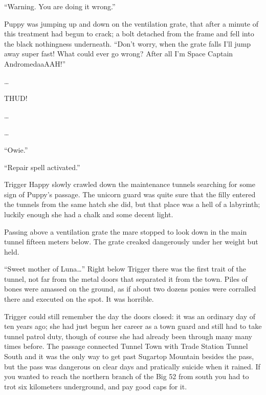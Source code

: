 \horizonline


``{\mt Warning. You are doing it wrong.}''

Puppy was jumping up and down on the ventilation grate, that after a minute of this treatment had begun to crack; a bolt detached from the frame and fell into the black nothingness underneath. ``Don't worry, when the grate falls I'll jump away super fast! What could ever go wrong? After all I'm Space Captain AndromedaaAAH!''

\ldots{}

THUD!

\ldots{}

\ldots{}

``Owie.''

``{\mt Repair spell activated.}''

\horizonline


Trigger Happy slowly crawled down the maintenance tunnels searching for some sign of Puppy's passage. The unicorn guard was quite sure that the filly entered the tunnels from the same hatch she did, but that place was a hell of a labyrinth; luckily enough she had a chalk and some decent light.

Passing above a ventilation grate the mare stopped to look down in the main tunnel fifteen meters below. The grate creaked dangerously under her weight but held.

``Sweet mother of Luna\dots'' Right below Trigger there was the first trait of the tunnel, not far from the metal doors that separated it from the town. Piles of bones were amassed on the ground, as if about two dozens ponies were corralled there and executed on the spot. It was horrible.

Trigger could still remember the day the doors closed: it was an ordinary day of ten years ago; she had just begun her career as a town guard and still had to take tunnel patrol duty, though of course she had already been through many many times before. The passage connected Tunnel Town with Trade Station Tunnel South and it was the only way to get past Sugartop Mountain besides the pass, but the pass was dangerous on clear days and pratically suicide when it rained. If you wanted to reach the northern branch of the Big 52 from south you had to trot six kilometers underground, and pay good caps for it.

